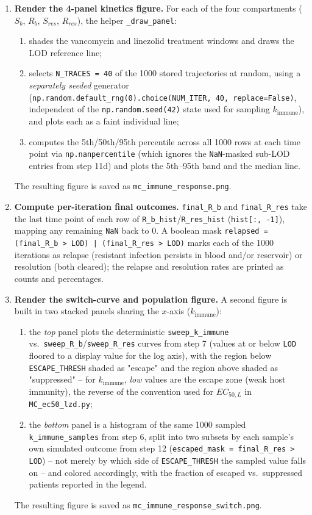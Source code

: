 \documentclass[11pt]{article}
\begin{document}
\begin{enumerate}
\item \textbf{Render the 4-panel kinetics figure.} For each of the four
compartments ($S_b$, $R_b$, $S_{res}$, $R_{res}$), the helper
\texttt{\_draw\_panel}:
\begin{enumerate}
\item[(a)] shades the vancomycin and linezolid treatment windows and draws
the LOD reference line;
\item[(b)] selects \texttt{N\_TRACES = 40} of the 1000 stored trajectories
at random, using a \emph{separately seeded} generator
(\texttt{np.random.default\_rng(0).choice(NUM\_ITER, 40, replace=False)},
independent of the \texttt{np.random.seed(42)} state used for sampling
$k_{\mathrm{immune}}$), and plots each as a faint individual line;
\item[(c)] computes the 5th/50th/95th percentile across all 1000 rows at
each time point via \texttt{np.nanpercentile} (which ignores the
\texttt{NaN}-masked sub-LOD entries from step 11d) and plots the
5th--95th band and the median line.
\end{enumerate}
The resulting figure is saved as \texttt{mc\_immune\_response.png}.

\item \textbf{Compute per-iteration final outcomes.}
\texttt{final\_R\_b} and \texttt{final\_R\_res} take the last time point of
each row of \texttt{R\_b\_hist}/\texttt{R\_res\_hist}
(\texttt{hist[:, -1]}), mapping any remaining \texttt{NaN} back to $0$. A
boolean mask \texttt{relapsed = (final\_R\_b > LOD) | (final\_R\_res > LOD)}
marks each of the 1000 iterations as relapse (resistant infection persists
in blood and/or reservoir) or resolution (both cleared); the relapse and
resolution rates are printed as counts and percentages.

\item \textbf{Render the switch-curve and population figure.} A second
figure is built in two stacked panels sharing the $x$-axis
($k_{\mathrm{immune}}$):
\begin{enumerate}
\item[(a)] the \emph{top} panel plots the deterministic
\texttt{sweep\_k\_immune} vs.\ \texttt{sweep\_R\_b}/\texttt{sweep\_R\_res}
curves from step 7 (values at or below \texttt{LOD} floored to a display
value for the log axis), with the region below \texttt{ESCAPE\_THRESH}
shaded as "escape" and the region above shaded as "suppressed" -- for
$k_{\mathrm{immune}}$, \emph{low} values are the escape zone (weak host
immunity), the reverse of the convention used for $EC_{50,L}$ in
\texttt{MC\_ec50\_lzd.py};
\item[(b)] the \emph{bottom} panel is a histogram of the same 1000 sampled
\texttt{k\_immune\_samples} from step 6, split into two subsets by each
sample's own simulated outcome from step 12
(\texttt{escaped\_mask = final\_R\_res > LOD}) -- not merely by which side
of \texttt{ESCAPE\_THRESH} the sampled value falls on -- and colored
accordingly, with the fraction of escaped vs.\ suppressed patients reported
in the legend.
\end{enumerate}
The resulting figure is saved as \texttt{mc\_immune\_response\_switch.png}.

\end{enumerate}
\end{document}
